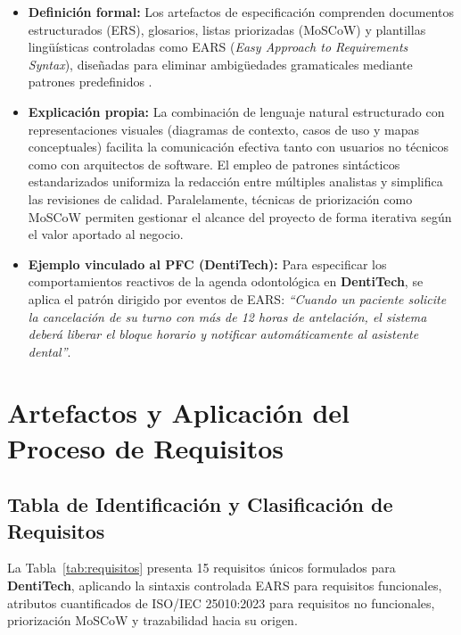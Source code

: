 \documentclass[11pt,a4paper]{article}
\begin{document}
\begin{itemize}
    \item \textbf{Definición formal:} Los artefactos de especificación comprenden documentos estructurados (ERS), glosarios, listas priorizadas (MoSCoW) y plantillas lingüísticas controladas como EARS (\textit{Easy Approach to Requirements Syntax}), diseñadas para eliminar ambigüedades gramaticales mediante patrones predefinidos \cite{pohl2025, pmbok2021, mavin2009}.
    \item \textbf{Explicación propia:} La combinación de lenguaje natural estructurado con representaciones visuales (diagramas de contexto, casos de uso y mapas conceptuales) facilita la comunicación efectiva tanto con usuarios no técnicos como con arquitectos de software. El empleo de patrones sintácticos estandarizados uniformiza la redacción entre múltiples analistas y simplifica las revisiones de calidad. Paralelamente, técnicas de priorización como MoSCoW permiten gestionar el alcance del proyecto de forma iterativa según el valor aportado al negocio.
    \item \textbf{Ejemplo vinculado al PFC (DentiTech):} Para especificar los comportamientos reactivos de la agenda odontológica en \textbf{DentiTech}, se aplica el patrón dirigido por eventos de EARS: \textit{``Cuando un paciente solicite la cancelación de su turno con más de 12 horas de antelación, el sistema deberá liberar el bloque horario y notificar automáticamente al asistente dental''}.
\end{itemize}

\newpage

\section{Artefactos y Aplicación del Proceso de Requisitos}

\subsection{Tabla de Identificación y Clasificación de Requisitos}

La Tabla~\ref{tab:requisitos} presenta 15 requisitos únicos formulados para \textbf{DentiTech}, aplicando la sintaxis controlada EARS \cite{mavin2009} para requisitos funcionales, atributos cuantificados de ISO/IEC 25010:2023 \cite{iso25010} para requisitos no funcionales, priorización MoSCoW y trazabilidad hacia su origen.
\end{document}
